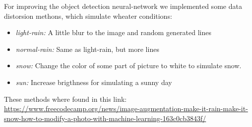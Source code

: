 For improving the object detection neural-network we implemented some data distorsion methons, which simulate wheater conditions:
\begin{itemize}
    \item \emph{light-rain:} A little blur to the image and random generated lines
    \item \emph{normal-rain:} Same as light-rain, but more lines
    \item \emph{snow:} Change the color of some part of picture to white to simulate snow.
    \item \emph{sun:} Increase brigthness for simulating a sunny day
\end{itemize}

These methods where found in this link: \url{https://www.freecodecamp.org/news/image-augmentation-make-it-rain-make-it-snow-how-to-modify-a-photo-with-machine-learning-163c0cb3843f/}

